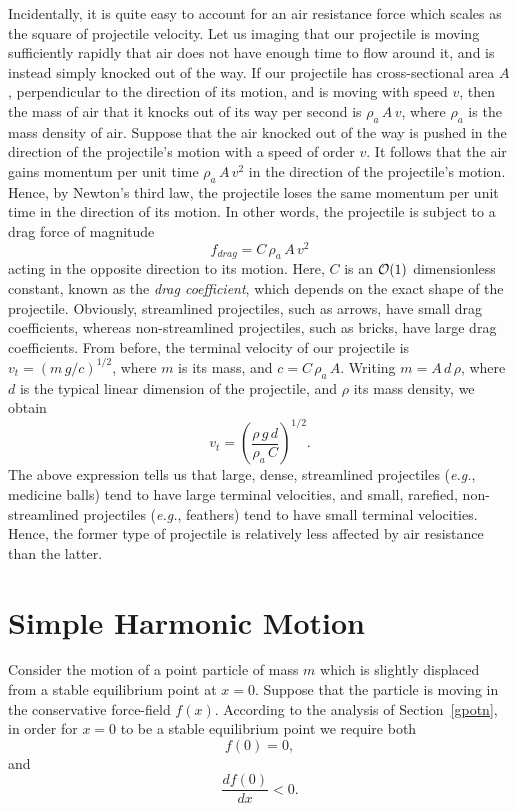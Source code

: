 Incidentally, it is quite easy to account for an air resistance force
which scales as the square of projectile velocity. Let us imaging that
our projectile is moving sufficiently rapidly that air does not have enough
time to flow around it, and is instead simply knocked out of the way.
If our projectile has cross-sectional area $A$,  perpendicular to the direction of its motion,
and is moving with speed $v$, then the mass of air that it knocks out of
its way per second is $\rho_a\,A\,v$, where $\rho_a$ is the mass density
of air. Suppose that the air knocked out of the way is pushed in the direction
of the projectile's motion with a speed of order $v$. It follows that the
air gains momentum per unit time $\rho_a\,A\,v^2$ in the direction
of the projectile's motion. Hence, by Newton's third law, the projectile
loses the same momentum per unit time in the direction of its motion.
In other words, the projectile is subject to a drag force of magnitude
\begin{equation}
f_{drag} = C\,\rho_a\,A\,v^2
\end{equation}
acting in the opposite direction to its motion.
Here, $C$ is an ${\cal O}(1)$ dimensionless constant, known as the
{\em drag coefficient}, which depends on the exact shape of the
projectile. Obviously, streamlined  projectiles, such as arrows, have small drag coefficients,
whereas non-streamlined projectiles, such as bricks, have large drag
coefficients. From before, the terminal velocity of our projectile is $v_t=
(m\,g/c)^{1/2}$, where $m$ is its mass, and $c=C\,\rho_a\,A$.
Writing $m = A\,d\,\rho$, where $d$ is the typical linear dimension
of the projectile, and $\rho$ its mass density, we obtain
\begin{equation}
v_t = \left(\frac{\rho\,g\,d}{\rho_a\,C}\right)^{1/2}.
\end{equation}
The above expression tells us that large, dense, streamlined projectiles ({\em e.g.}, medicine balls)
tend to have large terminal velocities, and small, rarefied, non-streamlined
projectiles ({\em e.g.}, feathers)  tend to have small terminal velocities. Hence, the former
type of projectile is relatively less affected by air resistance than the
latter.

\section{Simple Harmonic Motion}
Consider the motion of a point particle of mass $m$ which is
slightly displaced from a stable equilibrium point at $x=0$. 
Suppose that the particle is moving in the conservative force-field $f(x)$. According to the analysis of Section~\ref{gpotn}, in order for $x=0$ to be a stable equilibrium point
we require both
\begin{equation}\label{e4.8}
f(0) = 0,
\end{equation}
and
\begin{equation}\label{e4.9}
\frac{d f(0)}{dx} < 0.
\end{equation}

